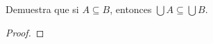 Demuestra que si \( A \subseteq B \), entonces 
\( \bigcup A \subseteq \bigcup B \).
\begin{proof}
    
\end{proof}
